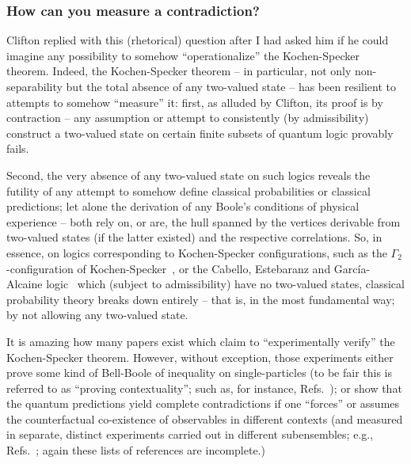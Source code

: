 \subsubsection{How can you measure a contradiction?}

Clifton replied with this (rhetorical) question
after I had asked him if he could imagine any possibility to somehow ``operationalize'' the Kochen-Specker theorem.
Indeed, the Kochen-Specker theorem -- in particular, not only non-separability but the total absence of any two-valued state --
has been resilient to attempts to somehow ``measure'' it:
first, as alluded by Clifton, its proof is by contraction --
any assumption or attempt to consistently (by admissibility)
construct a two-valued state on certain finite subsets of quantum logic provably fails.

Second, the very absence of any two-valued state on such logics reveals the futility of any attempt to somehow define classical probabilities
or classical predictions;
let alone the derivation of any Boole's conditions of physical experience --
both rely on, or are,  the hull spanned by the vertices derivable from two-valued states (if the latter existed) and the respective correlations.
So, in essence, on logics corresponding to Kochen-Specker configurations, such as
the $\Gamma_2$-configuration of Kochen-Specker~\cite[p.~69]{kochen1}, or
the Cabello, Estebaranz and Garc{\'{i}}a-Alcaine logic~\cite{cabello-96,cabello-99}
which (subject to admissibility) have no two-valued states,
classical probability theory breaks down entirely -- that is, in the most fundamental way;
by not allowing any two-valued state.



It is amazing how many papers exist which claim to ``experimentally verify'' the Kochen-Specker theorem.
However, without exception, those experiments either prove some kind of Bell-Boole of inequality
on single-particles (to be fair this is referred to as ``proving contextuality'';
such as, for instance, Refs.~\cite{Hasegawa-2003,hasegawa:230401,cabelloFilipp-2008,Bartosik-09,kirch-09});
or show that the quantum predictions yield complete contradictions if  one ``forces'' or assumes the counterfactual
co-existence of
observables in different contexts (and measured in separate, distinct experiments carried out in different subensembles; e.g.,
Refs.~\cite{ghz,cabello-99,Si-Zu-Wein-Ze-2000,panbdwz,simon-2002};
again these lists of references are incomplete.)

